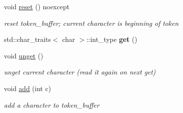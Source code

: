 \begin{DoxyCompactItemize}
void \mbox{\hyperlink{classnlohmann_1_1detail_1_1lexer_acba34bc18af19f93186e682d02c3942d}{reset}} () noexcept
\begin{DoxyCompactList}\small\item\em reset token\+\_\+buffer; current character is beginning of token \end{DoxyCompactList}\item 
\mbox{\label{classnlohmann_1_1detail_1_1lexer_a901e45a34e1fb1d97ab62350b0c3ef26}} 
std\+::char\+\_\+traits$<$ char $>$\+::int\+\_\+type {\bfseries get} ()
\item 
void \mbox{\hyperlink{classnlohmann_1_1detail_1_1lexer_a626f145768762057dc68a4666eb577db}{unget}} ()
\begin{DoxyCompactList}\small\item\em unget current character (read it again on next get) \end{DoxyCompactList}\item 
\mbox{\label{classnlohmann_1_1detail_1_1lexer_acec899d31af1fd647911e46e8535c283}} 
void \mbox{\hyperlink{classnlohmann_1_1detail_1_1lexer_acec899d31af1fd647911e46e8535c283}{add}} (int c)
\begin{DoxyCompactList}\small\item\em add a character to token\+\_\+buffer \end{DoxyCompactList}\end{DoxyCompactItemize}
